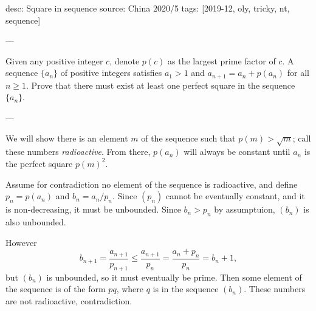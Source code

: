 desc: Square in sequence
source: China 2020/5
tags: [2019-12, oly, tricky, nt, sequence]

---

Given any positive integer $c$, denote $p(c)$ as the largest prime factor of $c$. A sequence $\{a_n\}$ of positive integers satisfies $a_1>1$ and $a_{n+1}=a_n+p(a_n)$ for all $n\ge1$. Prove that there must exist at least one perfect square in the sequence $\{a_n\}$.

---

We will show there is an element $m$ of the sequence such that $p(m)>\sqrt m$; call these numbers \emph{radioactive}. From there, $p(a_n)$ will always be constant until $a_n$ is the perfect square $p(m)^2$.

Assume for contradiction no element of the sequence is radioactive, and define $p_n=p(a_n)$ and $b_n=a_n/p_n$. Since $(p_n)$ cannot be eventually constant, and it is non-decreasing, it must be unbounded. Since $b_n>p_n$ by assumptuion, $(b_n)$ is also unbounded.

However \[b_{n+1}=\frac{a_{n+1}}{p_{n+1}}\le\frac{a_{n+1}}{p_n}=\frac{a_n+p_n}{p_n}=b_n+1,\]
but $(b_n)$ is unbounded, so it must eventually be prime. Then some element of the sequence is of the form $pq$, where $q$ is in the sequence $(b_n)$. These numbers are not radioactive, contradiction.
